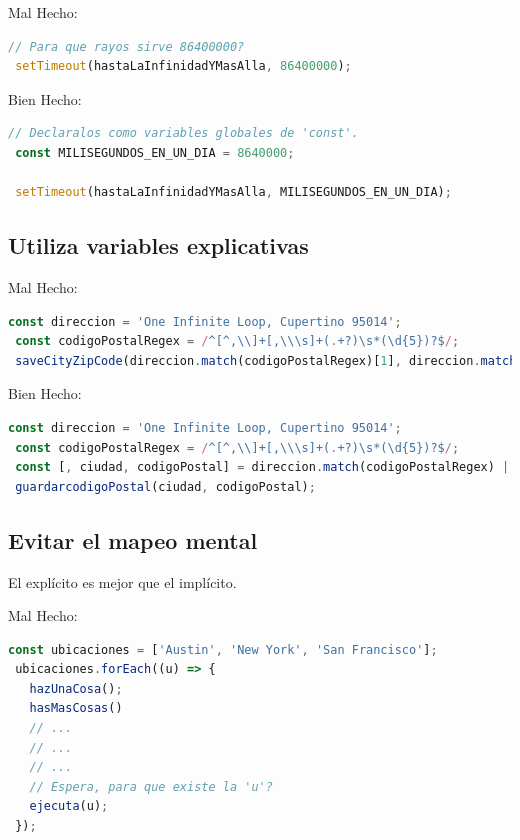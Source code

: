 \documentclass[a4paper, 12pt]{article}
\begin{document}
Mal Hecho:
\begin{lstlisting}[language=TypeScript, style=badstyle]
 // Para que rayos sirve 86400000?
 setTimeout(hastaLaInfinidadYMasAlla, 86400000);
\end{lstlisting}
\vspace{0.5cm} %

Bien Hecho:
\begin{lstlisting}[language=TypeScript, style=goodstyle]
 // Declaralos como variables globales de 'const'.
 const MILISEGUNDOS_EN_UN_DIA = 8640000;

 setTimeout(hastaLaInfinidadYMasAlla, MILISEGUNDOS_EN_UN_DIA);
\end{lstlisting}

\newpage

\subsection*{Utiliza variables explicativas}

Mal Hecho:
\begin{lstlisting}[language=TypeScript, style=badstyle]
 const direccion = 'One Infinite Loop, Cupertino 95014';
 const codigoPostalRegex = /^[^,\\]+[,\\\s]+(.+?)\s*(\d{5})?$/;
 saveCityZipCode(direccion.match(codigoPostalRegex)[1], direccion.match(codigoPostalRegex)[2]);
\end{lstlisting}
\vspace{0.5cm} %

Bien Hecho:
\begin{lstlisting}[language=TypeScript, style=goodstyle]
 const direccion = 'One Infinite Loop, Cupertino 95014';
 const codigoPostalRegex = /^[^,\\]+[,\\\s]+(.+?)\s*(\d{5})?$/;
 const [, ciudad, codigoPostal] = direccion.match(codigoPostalRegex) || [];
 guardarcodigoPostal(ciudad, codigoPostal);
\end{lstlisting}

\subsection*{Evitar el mapeo mental}

El explícito es mejor que el implícito.

Mal Hecho:
\begin{lstlisting}[language=TypeScript, style=badstyle]
 const ubicaciones = ['Austin', 'New York', 'San Francisco'];
 ubicaciones.forEach((u) => {
   hazUnaCosa();
   hasMasCosas()
   // ...
   // ...
   // ...
   // Espera, para que existe la 'u'?
   ejecuta(u);
 });
\end{lstlisting}
\vspace{0.5cm} %
\end{document}
